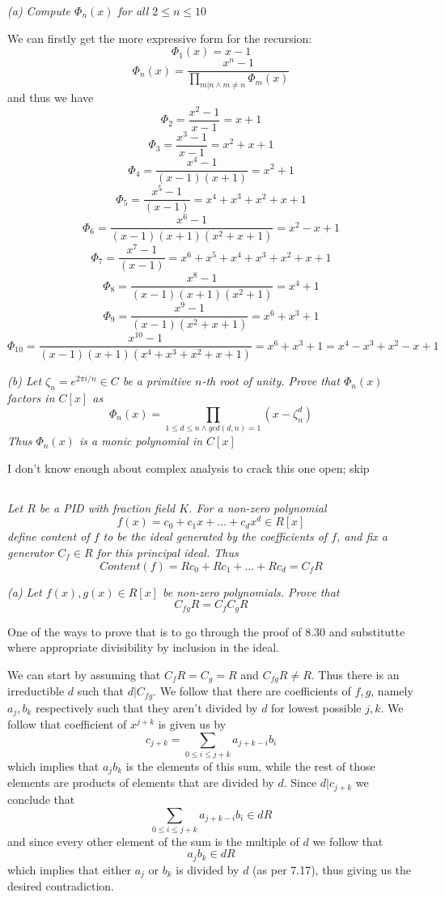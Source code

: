 \documentclass[11pt,oneside,titlepage]{book}
\begin{document}
\textit{(a) Compute $\Phi_n(x)$ for all $2 \leq n \leq 10$}

We can firstly get the more expressive form for the recursion:
$$\Phi_1(x) = x - 1$$
$$\Phi_n(x) = \frac{x^n - 1}{\prod_{m | n \land m \neq n}{\Phi_m(x)}}$$
and thus we have
$$\Phi_2 = \frac{x^2 - 1}{x - 1} = x + 1$$
$$\Phi_3 = \frac{x^3 - 1}{x - 1} = x^2 + x + 1$$
$$\Phi_4 = \frac{x^4 - 1}{(x - 1)(x + 1)} = x^2 + 1$$
$$\Phi_5 = \frac{x^5 - 1}{(x - 1)} = x^4 + x^3 + x^2 + x + 1$$
$$\Phi_6 = \frac{x^6 - 1}{(x - 1)(x + 1)(x^2 + x + 1)} = x^2 - x + 1$$
$$\Phi_7 = \frac{x^7 - 1}{(x - 1)} = x^6 + x^5 + x^4 + x^3 + x^2 + x + 1$$
$$\Phi_8 = \frac{x^8 - 1}{(x - 1)(x + 1)(x^2 + 1)} = x^4 + 1$$
$$\Phi_9 = \frac{x^9 - 1}{(x - 1)(x^2 + x + 1)} = x^6 + x^3 + 1$$
$$\Phi_{10} = \frac{x^{10} - 1}{(x - 1)(x + 1)(x^4 + x^3 + x^2 + x + 1)}
= x^6 + x^3 + 1 = x^4 - x^3 + x^2 - x + 1$$

\textit{(b) Let $\zeta_n = e^{2\pi i / n} \in C$ be a primitive $n$-th root of unity.
  Prove that $\Phi_n(x)$ factors in $C[x]$ as
  $$\Phi_n(x) = \prod_{1 \leq d \leq n \land gcd(d, n) = 1}{(x - \zeta^d_n)}$$
  Thus $\Phi_n(x)$ is a monic polynomial in $C[x]$}

I don't know enough about complex analysis to crack this one open; skip

\subsection{}

\textit{Let $R$ be a PID with fraction field $K$. For a non-zero
  polynomial
  $$f(x) = c_0 + c_1 x + ... + c_d x^d \in R[x]$$
  define content of $f$ to be the ideal generated by the coefficients
  of $f$, and fix a generator $C_f \in R$ for this principal ideal. Thus
  $$Content(f) = Rc_0 + Rc_1 + ... + Rc_d = C_fR$$
}

\textit{(a) Let $f(x), g(x) \in R[x]$ be non-zero polynomials. Prove that
  $$C_{fg} R = C_f C_g R$$
}

One of the ways to prove that is to go through the proof of 8.30 and
substitutte where appropriate divisibility by inclusion in the ideal.

We can start by assuming that $C_f R = C_g = R$ and $C_{fg} R \neq R$.
Thus there is an irreductible $d$ such that $d | C_{fg}$. We follow
that there are coefficients of $f, g$, namely $a_j, b_k$ respectively
such that they aren't divided by $d$ for lowest possible $j, k$. We
follow that coefficient of $x^{j + k}$ is given us by
$$c_{j + k} = \sum_{0 \leq i \leq j + k}{a_{j + k - i}b_i}$$
which implies that $a_j b_k$ is the elements of this sum, while the rest
of those elements are products of elements that are divided by $d$. Since
$d | c_{j + k}$ we conclude that
$$\sum_{0 \leq i \leq j + k}{a_{j + k - i}b_i} \in dR$$
and since every other element of the sum is the multiple of $d$ we follow that
$$a_j b_k \in dR$$
which implies that either $a_j$ or $b_k$ is divided by $d$ (as per 7.17),
thus giving us the desired contradiction.
\end{document}
